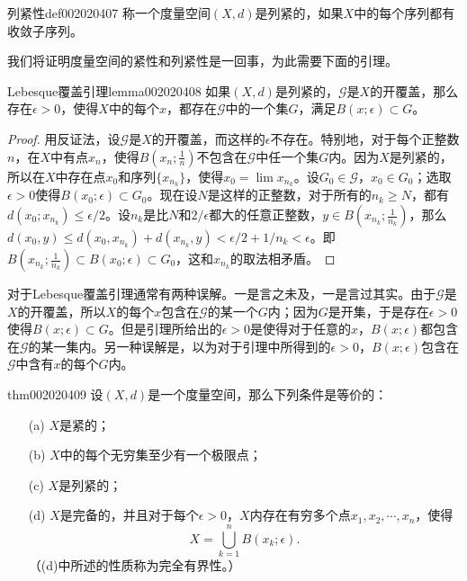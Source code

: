 \begin{definition}{列紧性}{def002020407}
称一个度量空间$(X, d)$是列紧的，如果$X$中的每个序列都有收敛子序列。
\end{definition}

我们将证明度量空间的紧性和列紧性是一回事，为此需要下面的引理。

\begin{lemma}{Lebesque覆盖引理}{lemma002020408}
如果$(X, d)$是列紧的，$\mathscr{G}$是$X$的开覆盖，那么存在$\epsilon > 0$，使得$X$中的每个$x$，都存在$\mathscr{G}$中的一个集$G$，满足$B(x; \epsilon) \subset G$。
\end{lemma}

\begin{proof}
用反证法，设$\mathscr{G}$是$X$的开覆盖，而这样的$\epsilon$不存在。特别地，对于每个正整数$n$，在$X$中有点$x_n$，使得$B(x_n;\frac{1}{n})$不包含在$\mathscr{G}$中任一个集$G$内。因为$X$是列紧的，所以在$X$中存在点$x_0$和序列$\{x_{n_k}\}$，使得$x_0 = \lim{x_{n_k}}$。设$G_0 \in \mathscr{G}$，$x_0 \in G_0$；选取$\epsilon >0$使得$B(x_0;\epsilon) \subset G_0$。现在设$N$是这样的正整数，对于所有的$n_k \ge N$，都有$d(x_0;x_{n_k}) \le \epsilon / 2$。设$n_k$是比$N$和$2/\epsilon$都大的任意正整数，$y \in B(x_{n_k};\frac{1}{n_k})$，那么$d(x_0, y) \le d(x_0, x_{n_k}) + d(x_{n_k}, y) < \epsilon / 2 + 1/n_k < \epsilon$。即$B(x_{n_k}; \frac{1}{n_k}) \subset B(x_0;\epsilon) \subset G_0$，这和$x_{n_k}$的取法相矛盾。
\end{proof}

对于Lebesque覆盖引理通常有两种误解。一是言之未及，一是言过其实。由于$\mathscr{G}$是$X$的开覆盖，所以$X$的每个$x$包含在$\mathscr{G}$的某一个$G$内；因为$G$是开集，于是存在$\epsilon > 0$使得$B(x;\epsilon) \subset G$。但是引理所给出的$\epsilon > 0$是使得对于任意的$x$，$B(x; \epsilon)$都包含在$\mathscr{G}$的某一集内。另一种误解是，以为对于引理中所得到的$\epsilon > 0$，$B(x; \epsilon)$包含在$\mathscr{G}$中含有$x$的每个$G$内。

\begin{theorem}{}{thm002020409}
设$(X, d)$是一个度量空间，那么下列条件是等价的：
\begin{enumerate}
\item[(a)]$X$是紧的；
\item[(b)]$X$中的每个无穷集至少有一个极限点；
\item[(c)]$X$是列紧的；
\item[(d)]$X$是完备的，并且对于每个$\epsilon > 0$，$X$内存在有穷多个点$x_1,x_2,\cdots, x_n$，使得
\[
X = \bigcup_{k=1}^{n}{B(x_k;\epsilon)}.
\]
（(d)中所述的性质称为完全有界性。）
\end{enumerate}
\end{theorem}

